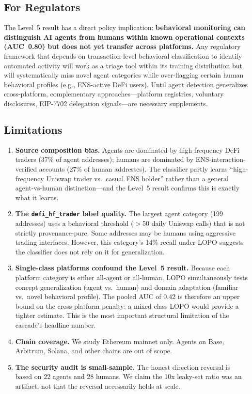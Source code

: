 \documentclass[sigconf,nonacm=false]{acmart}
\begin{document}
\subsection{For Regulators}

The Level~5 result has a direct policy implication: \textbf{behavioral monitoring can distinguish AI agents from humans within known operational contexts (AUC~0.80) but does not yet transfer across platforms.} Any regulatory framework that depends on transaction-level behavioral classification to identify automated activity will work as a triage tool within its training distribution but will systematically miss novel agent categories while over-flagging certain human behavioral profiles (e.g., ENS-active DeFi users). Until agent detection generalizes cross-platform, complementary approaches---platform registries, voluntary disclosures, EIP-7702 delegation signals---are necessary supplements.

\subsection{Limitations}

\begin{enumerate}
    \item \textbf{Source composition bias.} Agents are dominated by high-frequency DeFi traders (37\% of agent addresses); humans are dominated by ENS-interaction-verified accounts (27\% of human addresses). The classifier partly learns ``high-frequency Uniswap trader vs.\ casual ENS holder'' rather than a general agent-vs-human distinction---and the Level~5 result confirms this is exactly what it learns.
    \item \textbf{The \texttt{defi\_hf\_trader} label quality.} The largest agent category (199 addresses) uses a behavioral threshold ($>$50 daily Uniswap calls) that is not strictly provenance-pure. Some addresses may be humans using aggressive trading interfaces. However, this category's 14\% recall under LOPO suggests the classifier does not rely on it for generalization.
    \item \textbf{Single-class platforms confound the Level~5 result.} Because each platform category is either all-agent or all-human, LOPO simultaneously tests concept generalization (agent vs.\ human) and domain adaptation (familiar vs.\ novel behavioral profile). The pooled AUC of 0.42 is therefore an upper bound on the cross-platform penalty; a mixed-class LOPO would provide a tighter estimate. This is the most important structural limitation of the cascade's headline number.
    \item \textbf{Chain coverage.} We study Ethereum mainnet only. Agents on Base, Arbitrum, Solana, and other chains are out of scope.
    \item \textbf{The security audit is small-sample.} The honest direction reversal is based on 22 agents and 28 humans. We claim the 10x leaky-set ratio was an artifact, not that the reversal necessarily holds at scale.
\end{enumerate}
\end{document}

